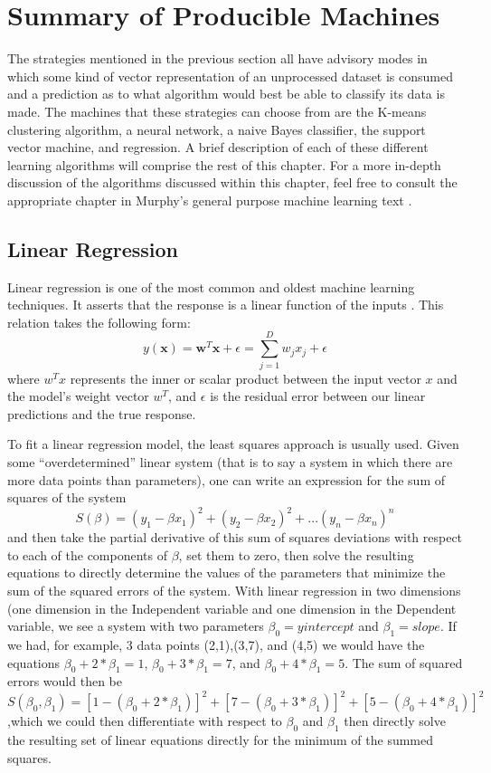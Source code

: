 \section{Summary of Producible Machines}
The strategies mentioned in the previous section all have advisory modes in which
some kind of vector representation of an unprocessed dataset is consumed and a
prediction as to what algorithm would best be able to classify its data is made.
The machines that these strategies can choose from are the K-means clustering
algorithm, a neural network, a naive Bayes classifier, the support
vector machine, and regression. A brief description of each of these different
learning algorithms will comprise the rest of this chapter. For a more in-depth
discussion of the algorithms discussed within this chapter, feel free to consult
the appropriate chapter in Murphy's general purpose machine learning text
\cite{Murphy}.
\subsection{Linear Regression}
Linear regression is one of the most common and oldest machine learning
techniques. It asserts that the response is a linear function
of the inputs \cite{Murphy}. This relation takes the following form:
$$ y(\textbf{x}) = \textbf{w}^T\textbf{x} + \epsilon = \sum_{j=1}^{D}w_jx_j + \epsilon $$
where $w^Tx$ represents the inner or scalar product between the input vector $x$
and the model's weight vector $w^T$, and $\epsilon$ is the residual error
between our linear predictions and the true response.

To fit a linear regression model, the least squares approach is usually used.
Given some  ``overdetermined'' linear system (that is to say a system in which
there are more data points than parameters), one can write an expression for the
sum of squares of the system
$$S(\beta) = (y_1 - \beta x_1)^2 + (y_2 - \beta x_2)^2 + ... (y_n - \beta x_n)^n$$
and then take the partial derivative of this sum of squares deviations with respect
to each of the components of $\beta$, set them to zero, then solve the resulting
equations to directly determine the values of the parameters that
minimize the sum of the squared errors of the system. With linear regression in
two dimensions (one dimension in the Independent variable and one dimension in
the Dependent variable, we see a system with two parameters
$\beta_0 = y intercept$ and $\beta_1 = slope$. If we had, for example, 3 data
points (2,1),(3,7), and (4,5) we would have the equations
$\beta_0 + 2*\beta_1 = 1$, $\beta_0 + 3*\beta_1 = 7$, and
$\beta_0 + 4*\beta_1 = 5$. The sum of squared errors would then be
 $S(\beta_0,\beta_1)= [1 - (\beta_0 + 2*\beta_1)]^2 + [7 - (\beta_0 + 3*\beta_1)]^2 + [5 - (\beta_0 + 4*\beta_1)]^2$
,which we could then differentiate with respect to $\beta_0$ and $\beta_1$ then
directly solve the resulting set of linear equations directly for the minimum of
the summed squares.
